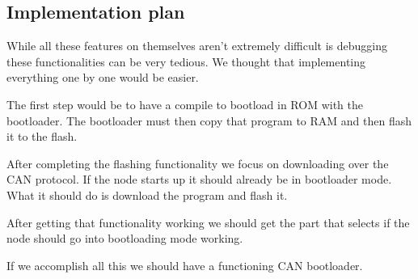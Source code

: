 \documentclass[twocolumn]{article}
\begin{document}
	\subsection*{Implementation plan}
		While all these features on themselves aren't extremely difficult is debugging these functionalities can be very tedious.
		We thought that implementing everything one by one would be easier.
		
		The first step would be to have a compile to bootload in ROM with the bootloader.
		The bootloader must then copy that program to RAM and then flash it to the flash.
		
		After completing the flashing functionality we focus on downloading over the CAN protocol.
		If the node starts up it should already be in bootloader mode.
		What it should do is download the program and flash it.
		
		After getting that functionality working we should get the part that selects if the node should go into bootloading mode working.
		
		If we accomplish all this we should have a functioning CAN bootloader.
\end{document}
